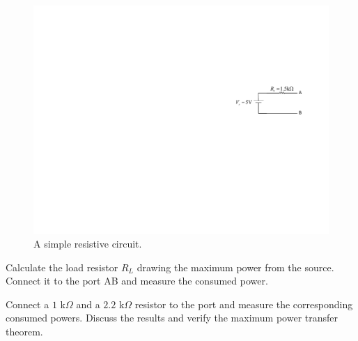 \documentclass[11pt]{article}
\begin{document}

\begin{question}


\begin{figure}[H]
\centering
\includegraphics[scale=1.2,angle=0]{Fig/cir3.pdf}
\caption{A simple resistive circuit.} \label{fig:cir3}
\end{figure}


\begin{subquestion}{Calculate the load resistor $R_L$ drawing the maximum power from the source. Connect it to the port AB and measure the consumed power.} 
\answer{}
\end{subquestion}

\begin{subquestion}{Connect a $1$ k$\Omega$ and a $2.2$ k$\Omega$ resistor to the port and measure the corresponding consumed powers. Discuss the results and verify the maximum power transfer theorem.} 
\answer{}
\end{subquestion}


\end{question}

\end{document}

